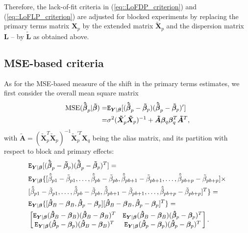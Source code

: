 Therefore, the lack-of-fit criteria in (\ref{eq::LoFDP_criterion}) and (\ref{eq::LoFLP_criterion}) are adjusted for blocked experiments by replacing the primary terms matrix $\bm{X}_{p}$ by the extended matrix $\bm{\tilde{X}}_{p}$ and the dispersion matrix $\bm{L}$ -- by $\bm{\tilde{L}}$ as obtained above.

\subsection{MSE-based criteria}

As for the MSE-based measure of the shift in the primary terms estimates, we first consider the overall mean square matrix  
\begin{align}
\label{eq::MSE_b}
\mbox{MSE}(\bm{\hat{\tilde{\beta}}}_p|\bm{\tilde{\beta}})=&\mathtt{E}_{\bm{Y}|\bm{\beta}}[(\bm{\hat{\tilde{\beta}}}_p-\bm{\tilde{\beta}}_p)(\bm{\hat{\tilde{\beta}}}_p-\bm{\tilde{\beta}}_p)'] \notag\\=&\sigma^2(\bm{\tilde{X}}_p^{'}\bm{\tilde{X}}_p)^{-1}+\bm{\tilde{A}}\bm{\beta}_q\bm{\beta}_q^T\bm{\tilde{A}}^T, 
\end{align}
with $\bm{\tilde{A}}=(\bm{\tilde{X}}_p^T\bm{\tilde{X}}_p)^{-1}\bm{\tilde{X}}_p^{'T}\bm{X}_q$ being the alias matrix, 
and its partition with respect to block and primary effects:
\begin{align*}
&\mathtt{E}_{\bm{Y}|\bm{\beta}}[(\bm{\hat{\tilde{\beta}}}_p-\bm{\tilde{\beta}}_p)(\bm{\hat{\tilde{\beta}}}_p-\bm{\tilde{\beta}}_p)^T]= \notag\\ &\mathtt{E}_{\bm{Y}|\bm{\beta}}\{[\hat{\tilde{\beta}}_{p1}-\tilde{\beta}_{p1},\ldots,
\hat{\tilde{\beta}}_{pb}-\tilde{\beta}_{pb}, \hat{\tilde{\beta}}_{p b+1}-\tilde{\beta}_{p b+1},\ldots, \hat{\tilde{\beta}}_{p b+p}-\tilde{\beta}_{p b+p}]\times \notag\\ &[\hat{\tilde{\beta}}_{p 1}-\tilde{\beta}_{p1},\ldots,
\hat{\tilde{\beta}}_{pb}-\tilde{\beta}_{pb}, \hat{\tilde{\beta}}_{p b+1}-\tilde{\beta}_{p b+1},\ldots, \hat{\tilde{\beta}}_{p b+p}-\tilde{\beta}_{p b+p}]^T\}=\notag\\
&\mathtt{E}_{\bm{Y}|\bm{\beta}}\{[\bm{\hat{\beta}}_B-\bm{\beta}_B, \bm{\hat{\beta}}_p-\bm{\beta}_p][\bm{\hat{\beta}}_B-\bm{\beta}_B, \bm{\hat{\beta}}_p-\bm{\beta}_p]^T\}=\notag\\
&\begin{bmatrix}
\mathtt{E}_{\bm{Y}|\bm{\beta}}(\bm{\hat{\beta}}_B-\bm{\beta}_B)(\bm{\hat{\beta}}_B-\bm{\beta}_B)^T & \mathtt{E}_{\bm{Y}|\bm{\beta}}(\bm{\hat{\beta}}_B-\bm{\beta}_B)(\bm{\hat{\beta}}_p-\bm{\beta}_p)^T\\
\mathtt{E}_{\bm{Y}|\bm{\beta}}(\bm{\hat{\beta}}_p-\bm{\beta}_p)(\bm{\hat{\beta}}_B-\bm{\beta}_B)^T & \mathtt{E}_{\bm{Y}|\bm{\beta}}(\bm{\hat{\beta}}_p-\bm{\beta}_p)(\bm{\hat{\beta}}_p-\bm{\beta}_p)^T
\end{bmatrix}.
\end{align*}

